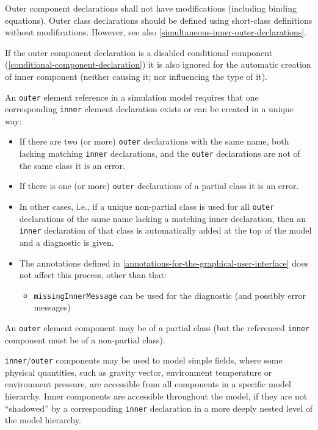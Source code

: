 Outer component declarations shall not have modifications (including binding equations).
Outer class declarations should be defined using short-class definitions without modifications.
However, see also \cref{simultaneous-inner-outer-declarations}.

If the outer component declaration is a disabled conditional component (\cref{conditional-component-declaration}) it is also ignored for the automatic creation of inner component (neither causing it; nor influencing the type of it).

An \lstinline!outer! element reference in a simulation model requires that one corresponding \lstinline!inner! element declaration exists or can be created in a unique way:
\begin{itemize}
\item
  If there are two (or more) \lstinline!outer! declarations with the same name, both lacking matching \lstinline!inner! declarations, and the \lstinline!outer! declarations are not of the same class it is an error.
\item
  If there is one (or more) \lstinline!outer! declarations of a partial class it is an error.
\item
  In other cases, i.e., if a unique non-partial class is used for all \lstinline!outer! declarations of the same name lacking a matching inner declaration, then an \lstinline!inner! declaration of that class is automatically added at the top of the model and a diagnostic is given.
\item
  The annotations defined in \cref{annotations-for-the-graphical-user-interface} does not affect this process, other than that:
  \begin{itemize}
  \item
    \lstinline!missingInnerMessage! can be used for the diagnostic (and possibly error messages)
  \end{itemize}
\end{itemize}

An \lstinline!outer! element component may be of a partial class (but the referenced \lstinline!inner! component must be of a non-partial class).

\begin{nonnormative}
\lstinline!inner!/\lstinline!outer! components may be used to model simple fields, where some physical quantities, such as gravity vector, environment temperature or environment pressure, are accessible from all components in a specific model hierarchy.
Inner components are accessible throughout the model, if they are not ``shadowed'' by a corresponding \lstinline!inner! declaration in a more deeply nested level of the model hierarchy.
\end{nonnormative}


